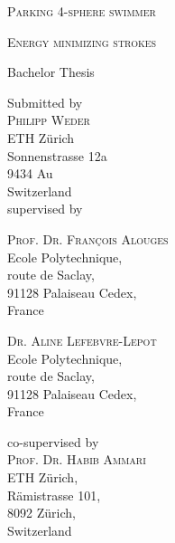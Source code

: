 \documentclass[10pt,a4paper, twoside]{article}
\author{Philipp Weder}
\date{}
\numberwithin{equation}{section}
\theoremstyle{plain}
\theoremstyle{plain}
\theoremstyle{plain}
\theoremstyle{remark}
\theoremstyle{definition}
\theoremstyle{definition}
\theoremstyle{plain}
\theoremstyle{plain}
\begin{document}
\thispagestyle{plain}

\begin{center}
   \vspace*{1cm} 

   \Huge
   \textsc{Parking 4-sphere swimmer}
   
  \vspace{0.25cm}
   \Large
   \textsc{Energy minimizing strokes}
   \vspace{1.5cm}
   
   Bachelor Thesis
   \vspace{1cm}
    \normalsize
    
    Submitted by\\
    \vspace{2em}
    \textsc{Philipp Weder}\\
    ETH Zürich\\
    Sonnenstrasse 12a\\
    9434 Au\\
    Switzerland\\
    \vspace{2em}
    supervised by\\
    \vspace{2em}
    \begin{minipage}[t]{0.4\textwidth}
    \begin{center}
    \textsc{Prof. Dr. François Alouges}\\
    Ecole Polytechnique,\\
    route de Saclay,\\
    91128 Palaiseau Cedex,\\
    France
    \end{center}
    \end{minipage}
    \begin{minipage}[t]{0.4\textwidth}
    \begin{center}
    \textsc{Dr. Aline Lefebvre-Lepot}\\
    Ecole Polytechnique,\\
    route de Saclay,\\
    91128 Palaiseau Cedex,\\
    France
    \end{center}
    \end{minipage}

    \vspace{2em}
    co-supervised by\\
    \vspace{2em}
    \textsc{Prof. Dr. Habib Ammari}\\
    ETH Zürich,\\
    Rämistrasse 101,\\
    8092 Zürich,\\
    Switzerland
    
    
\end{center}
  \vspace{1cm}
    
\end{document}
